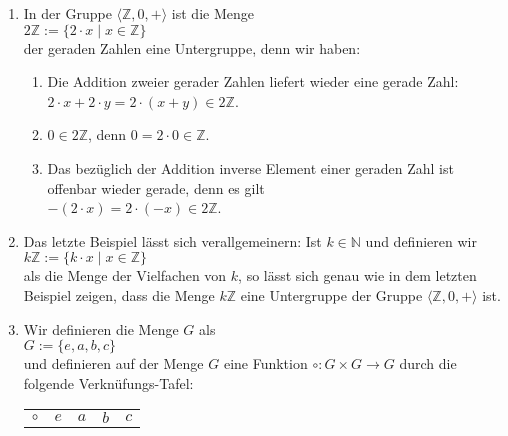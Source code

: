 \examples
\begin{enumerate}
\item In der Gruppe $\langle \mathbb{Z}, 0, + \rangle$ ist die Menge
      \\[0.2cm]
      \hspace*{1.3cm}
      $2 \mathbb{Z} := \{ 2 \cdot x \mid x \in \mathbb{Z} \}$
      \\[0.2cm]
      der geraden Zahlen eine Untergruppe, denn wir haben:
      \begin{enumerate}
      \item Die Addition zweier gerader Zahlen liefert wieder eine gerade Zahl:
            \\[0.2cm]
            \hspace*{1.3cm}
            $2 \cdot x + 2 \cdot y = 2 \cdot (x + y) \in 2 \mathbb{Z}$.
      \item $0 \in 2 \mathbb{Z}$, denn $0 = 2 \cdot 0 \in \mathbb{Z}$.
      \item Das bez\"{u}glich der Addition inverse Element einer geraden Zahl ist offenbar wieder gerade,
            denn es gilt
            \\[0.2cm]
            \hspace*{1.3cm}
            $- (2 \cdot x) = 2 \cdot (-x) \in 2 \mathbb{Z}$.
      \end{enumerate}
\item Das letzte Beispiel l\"{a}sst sich verallgemeinern: Ist $k \in \mathbb{N}$ und definieren wir
      \\[0.2cm]
      \hspace*{1.3cm}
      $k \mathbb{Z} := \{ k \cdot x \mid x \in \mathbb{Z} \}$
      \\[0.2cm]
      als die Menge der Vielfachen von $k$, so l\"{a}sst sich genau wie in dem letzten Beispiel zeigen, dass
      die Menge $k\mathbb{Z}$ eine Untergruppe der Gruppe $\langle \mathbb{Z}, 0, + \rangle$ ist.
\item Wir definieren die Menge $G$ als
      \\[0.2cm]
      \hspace*{1.3cm}
      $G := \{ e, a, b, c \}$
      \\[0.2cm]
      und definieren auf der Menge $G$ eine Funktion $\circ: G \times G \rightarrow G$ durch
      die folgende Verkn\"{u}fungs-Tafel:
      \\[0.2cm]
      \hspace*{1.3cm}
      \begin{tabular}[t]{l|llll}
      $\circ$ & $e$ & $a$ & $b$ & $c$ \\

\end{tabular}
\end{enumerate}
